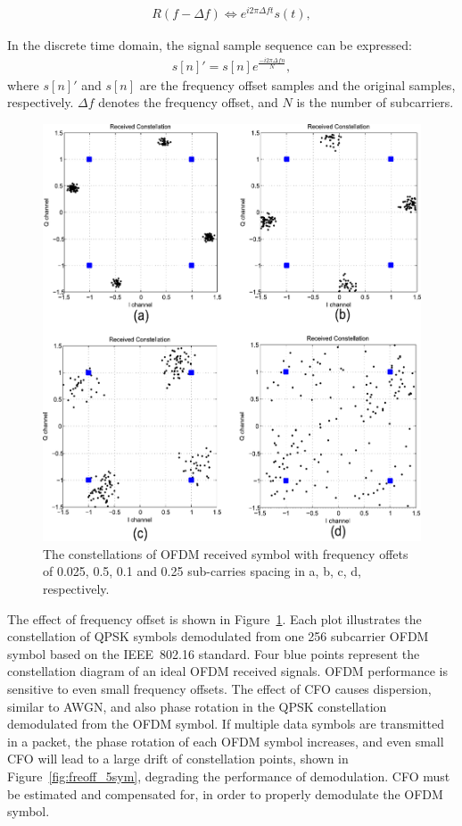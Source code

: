 \begin{eqnarray}
\label{equ:}
             R(f - \Delta f) \Leftrightarrow  e^{i2\pi \Delta ft} s(t),
\end{eqnarray}

In the discrete time domain, the signal sample sequence can be expressed:
\begin{eqnarray}
\label{equ:}
            s[n]' = s[n] e^{\frac{− i2\pi \Delta fn}{N}},
\end{eqnarray}
where $s[n]'$ and $s[n]$ are the frequency offset samples and the original samples, respectively.
$\Delta f$ denotes the frequency offset, and $N$ is the number of subcarriers.
\begin{figure}
	\centerline{\includegraphics [width=0.8\columnwidth] {Figures/freoff_1sym.pdf} }
	\caption{The constellations of OFDM received symbol with frequency offets of 0.025, 0.5, 0.1 and 0.25 sub-carries spacing in a, b, c, d, respectively.}
	\label{fig:freoff_1sym}
\end{figure}
The effect of frequency offset is shown in Figure~\ref{fig:freoff_1sym}. Each plot illustrates the constellation of QPSK symbols demodulated from one 256 subcarrier OFDM symbol based on the IEEE~802.16 standard.
Four blue points represent the constellation diagram of an ideal OFDM received signals.
OFDM performance is sensitive to even small frequency offsets.
The effect of CFO causes dispersion, similar to AWGN, and also phase rotation in the QPSK constellation demodulated from the OFDM symbol.
If multiple data symbols are transmitted in a packet, the phase rotation of each OFDM symbol increases, and even small CFO will lead to a large drift of constellation points, shown in Figure~\ref{fig:freoff_5sym}, degrading the performance of demodulation. CFO must be estimated and compensated for, in order to properly demodulate the OFDM symbol.

